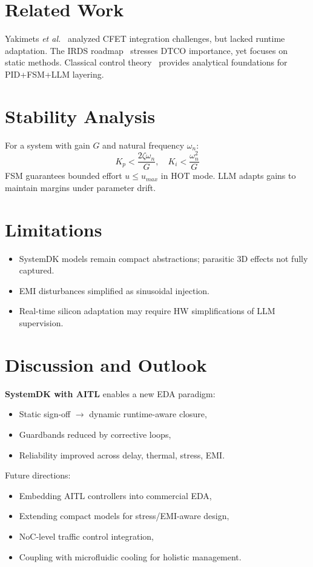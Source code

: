 \documentclass[conference]{IEEEtran}
\begin{document}
\section{Related Work}
Yakimets \textit{et al.}~\cite{yakimets2020cfet} analyzed CFET integration challenges,
but lacked runtime adaptation. The IRDS roadmap~\cite{irds2023} stresses DTCO importance,
yet focuses on static methods. Classical control theory~\cite{franklin2015,khalil2002,anderson2007optimal}
provides analytical foundations for PID+FSM+LLM layering.

\section{Stability Analysis}
For a system with gain $G$ and natural frequency $\omega_n$:
\begin{equation}
K_p < \frac{2\zeta\omega_n}{G}, \quad 
K_i < \frac{\omega_n^2}{G}
\end{equation}
FSM guarantees bounded effort $u\le u_{max}$ in HOT mode.
LLM adapts gains to maintain margins under parameter drift.

\section{Limitations}
\begin{itemize}
  \item SystemDK models remain compact abstractions; parasitic 3D effects not fully captured.
  \item EMI disturbances simplified as sinusoidal injection.
  \item Real-time silicon adaptation may require HW simplifications of LLM supervision.
\end{itemize}

\section{Discussion and Outlook}
\textbf{SystemDK with AITL} enables a new EDA paradigm:
\begin{itemize}
  \item Static sign-off $\to$ dynamic runtime-aware closure,
  \item Guardbands reduced by corrective loops,
  \item Reliability improved across delay, thermal, stress, EMI.
\end{itemize}
Future directions:
\begin{itemize}
  \item Embedding AITL controllers into commercial EDA,
  \item Extending compact models for stress/EMI-aware design,
  \item NoC-level traffic control integration,
  \item Coupling with microfluidic cooling for holistic management.
\end{itemize}
\end{document}
